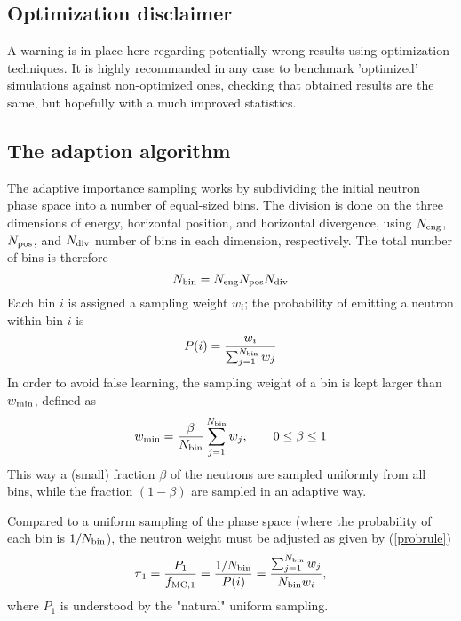 \subsection{Optimization disclaimer}

A warning is in place here regarding potentially wrong results
using optimization techniques.
It is highly recommanded in any case to benchmark 'optimized' simulations
against non-optimized ones, checking that obtained results are the same,
but hopefully with a much improved statistics.

\subsection{The adaption algorithm}

The adaptive importance sampling works by subdividing the initial
neutron phase space into a number of equal-sized bins. The division is
done on the three dimensions of energy, horizontal position, and
horizontal divergence, using $N_{\rm eng}$, $N_{\rm pos}$, and $N_{\rm
  div}$ number of bins in each dimension, respectively. The total number
of bins is therefore
\begin{equation}
N_{\rm bin} = N_{\rm eng} N_{\rm pos} N_{\rm div}
\end{equation}
Each bin $i$ is assigned a sampling weight $w_i$; the probability of
emitting a neutron within bin $i$ is
\begin{equation}
P(i) = \frac{w_i}{\sum_{j=1}^{N_{\rm bin}} w_j}
\end{equation}
In order to avoid false learning, the sampling weight of a bin is
kept larger than $w_{\rm min}$, defined as
\begin{equation}
w_{\rm min} = \frac{\beta}{N_{\rm bin}}\sum_{j=1}^{N_{\rm bin}}w_j,\qquad
    0 \leq \beta \leq 1
\end{equation}
This way a (small) fraction $\beta$ of the neutrons are sampled
uniformly from all bins, while the fraction $(1 - \beta)$ are sampled in an adaptive way.

Compared to a uniform sampling of the phase space (where the probability
of each bin is $1/N_{\rm bin}$), the neutron weight
must be adjusted as given by (\ref{probrule})
\begin{equation}
\pi_1 = \frac{P_1}{f_{\rm MC,1}} =\frac{1/N_{\rm bin}}{P(i)} =
    \frac{\sum_{j=1}^{N_{\rm bin}} w_j}{N_{\rm bin} w_i} ,
\end{equation}
where $P_1$ is understood by the "natural" uniform sampling.

